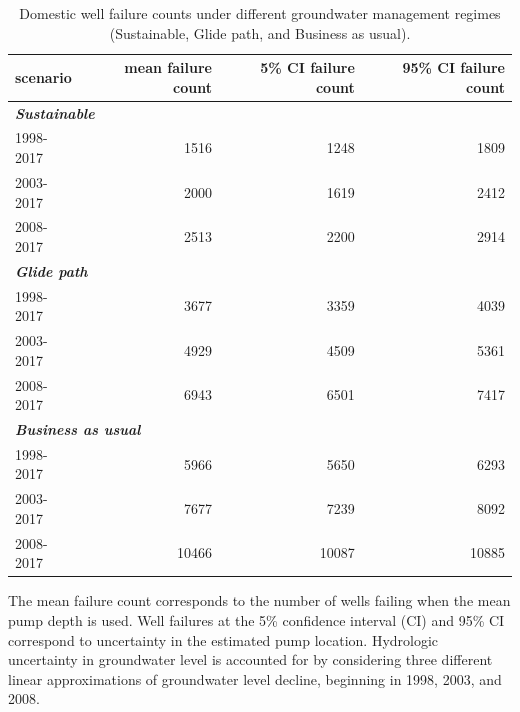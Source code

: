 \begin{table}[ht]
	\centering\footnotesize
	\caption{Domestic well failure counts under different groundwater management regimes (Sustainable, Glide path, and Business as usual).}
	\label{tab:dom_failures}
	\begin{threeparttable}
	
		
		\begin{tabular}{lrrr}

			\hline
			\hline
			
			\textbf{scenario} & \textbf{mean failure count} & \textbf{5\% CI failure count} & \textbf{95\% CI failure count} \\
			
			\hline
			
			\multicolumn{4}{l}{\textbf{\textit{Sustainable}}}\\
			\hspace{1em}1998-2017 & 1516 & 1248 & 1809\\
			\hspace{1em}2003-2017 & 2000 & 1619 & 2412\\
			\hspace{1em}2008-2017 & 2513 & 2200 & 2914\\
			
			\hline
			\multicolumn{4}{l}{\textbf{\textit{Glide path}}}\\
			\hspace{1em}1998-2017 & 3677 & 3359 & 4039\\
			\hspace{1em}2003-2017 & 4929 & 4509 & 5361\\
			\hspace{1em}2008-2017 & 6943 & 6501 & 7417\\
			
			\hline
			\multicolumn{4}{l}{\textbf{\textit{Business as usual}}}\\
			\hspace{1em}1998-2017 & 5966 & 5650 & 6293\\
			\hspace{1em}2003-2017 & 7677 & 7239 & 8092\\
			\hspace{1em}2008-2017 & 10466 & 10087 & 10885\\
			\hline
			
		\end{tabular}
		
		\begin{tablenotes} 
		
			The mean failure count corresponds to the number of wells failing when the mean pump depth is used. Well failures at the 5\% confidence interval (CI) and 95\% CI correspond to uncertainty in the estimated pump location. Hydrologic uncertainty in groundwater level is accounted for by considering three different linear approximations of groundwater level decline, beginning in 1998, 2003, and 2008.
		\end{tablenotes}
	\end{threeparttable}
\end{table}

